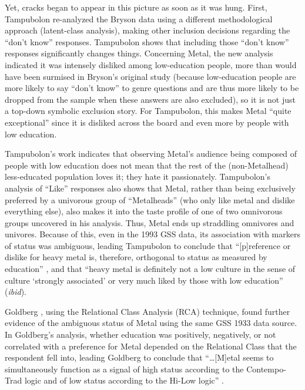 \documentclass[a4paper,12pt]{article}
\begin{document}
Yet, cracks began to appear in this picture as soon as it was hung. First, Tampubolon \citeyearpar{tampubolon2008revisiting} re-analyzed the Bryson data using a different methodological approach (latent-class analysis), making other inclusion decisions regarding the ``don't know'' responses. Tampubolon shows that including those ``don't know'' responses significantly changes things. Concerning Metal, the new analysis indicated it was intensely disliked among low-education people, more than would have been surmised in Bryson's original study (because low-education people are more likely to say ``don't know'' to genre questions and are thus more likely to be dropped from the sample when these answers are also excluded), so it is not just a top-down symbolic exclusion story. For Tampubolon, this makes Metal ``quite exceptional'' since it is disliked across the board and even more by people with low education. 

Tampubolon's work indicates that observing Metal's audience being composed of people with low education does not mean that the rest of the (non-Metalhead) less-educated population loves it; they hate it passionately. Tampubolon's analysis of ``Like'' responses also shows that Metal, rather than being exclusively preferred by a univorous group of ``Metalheads'' (who only like metal and dislike everything else), also makes it into the taste profile of one of two omnivorous groups uncovered in his analysis. Thus, Metal ends up straddling omnivores and univores. Because of this, even in the 1993 GSS data, its association with markers of status was ambiguous, leading Tampubolon to conclude that ``[p]reference or dislike for heavy metal is, therefore, orthogonal to status as measured by education'' \citeyearpar[][257]{tampubolon2008revisiting}, and that ``heavy metal is definitely not a low culture in the sense of culture `strongly associated' or very much liked by those with low education'' (\textit{ibid}). 

Goldberg \citeyearpar{goldberg2011mapping}, using the Relational Class Analysis (RCA) technique, found further evidence of the ambiguous status of Metal using the same GSS 1933 data source. In Goldberg's analysis, whether education was positively, negatively, or not correlated with a preference for Metal depended on the Relational Class that the respondent fell into, leading Goldberg to conclude that ``\ldots [M]etal seems to simultaneously function as a signal of high status according to the Contempo-Trad logic and of low status according to the Hi-Low logic'' \citeyearpar[][1421]{goldberg2011mapping}.
\end{document}
